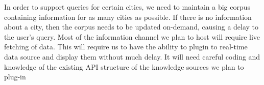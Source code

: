 In order to support queries for certain cities, we need to maintain a big corpus containing information for as many cities as possible. If there is no information about a city, then the corpus needs to be updated on-demand, causing a delay to the user's query. Most of the information channel we plan to host will require live fetching of data. This will require us to have the ability to plugin to real-time data source and display them without much delay. It will need careful coding and knowledge of the existing API structure of the knowledge sources we plan to plug-in
